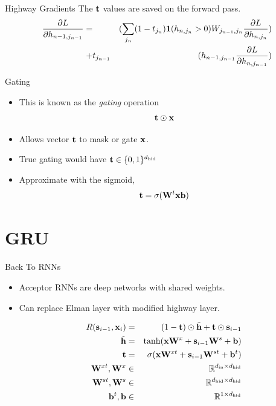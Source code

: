 \documentclass{beamer}
\begin{document}
\begin{frame}{Highway Gradients}
    The $\mathbf{t}$ values are saved on the forward pass.
  \begin{eqnarray*}
     \frac{\partial L}{\partial h_{n-1,j_{n-1}} }  =  && (\sum_{j_n} (1-t_{j_n})  \mathbf{1}(h_{n, j_n} > 0) W_{j_{n-1},j_n} \frac{\partial L}{\partial h_{n, j_n}}) \\
    + &t_{j_{n-1}}& ( h_{n-1, j_{n-1}} \frac{\partial L}{\partial h_{n, j_{n-1}}})  \\ 
  \end{eqnarray*}
\end{frame}


\begin{frame}{Gating}
  \begin{itemize}
  \item This is known as the \textit{gating} operation
    \[ \mathbf{t} \odot \mathbf{x} \]
    \air 

  \item Allows vector $\mathbf{t}$ to mask or gate $\mathbf{x}$.
    \air

  \item True gating would have $\mathbf{t} \in \{0,1\}^{{d_{\mathrm{hid}}}}$

    \air 
  \item Approximate with the sigmoid,
    \[\mathbf{t} = \sigma( \mathbf{W}^t \mathbf{x} \mathbf{b}) \] 
  \end{itemize}
\end{frame}

\section{GRU}

\begin{frame}{Back To RNNs}
  \begin{itemize}
  \item Acceptor RNNs are deep networks with shared weights.
    \air 

  \item Can replace Elman layer with modified highway layer. 

    \begin{eqnarray*}
      R(\mathbf{s}_{i-1}, \mathbf{x}_i) &=& (1-\mathbf{t}) \odot \tilde{\mathbf{h}} + \mathbf{t} \odot \mathbf{s}_{i-1} \\
      \tilde{\mathbf{h}} &=& \tanh(\mathbf{x} \mathbf{W}^x + \mathbf{s}_{i-1} \mathbf{W}^s + \mathbf{b})  \\
      \mathbf{t} &=& \sigma(\mathbf{x} \mathbf{W}^{xt} + \mathbf{s}_{i-1}\mathbf{W}^{st} + \mathbf{b}^t) \\
      \mathbf{W}^{xt}, \mathbf{W}^{x} &\in& \mathbb{R}^{{d_{\mathrm{in}}} \times {d_{\mathrm{hid}}}} \\
      \mathbf{W}^{st}, \mathbf{W}^{s} &\in& \mathbb{R}^{{d_{\mathrm{hid}}} \times {d_{\mathrm{hid}}}} \\
      \mathbf{b}^t, \mathbf{b} &\in& \mathbb{R}^{1 \times {d_{\mathrm{hid}}}} \\
    \end{eqnarray*}
  \end{itemize}
\end{frame}
\end{document}
